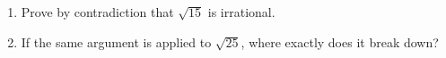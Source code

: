 \begin{enumerate}
\item[(a)] Prove by contradiction that $\sqrt{15}$ is irrational.
\item[(b)] If the same argument is applied to $\sqrt{25}$, where exactly does it break down?
\end{enumerate}
